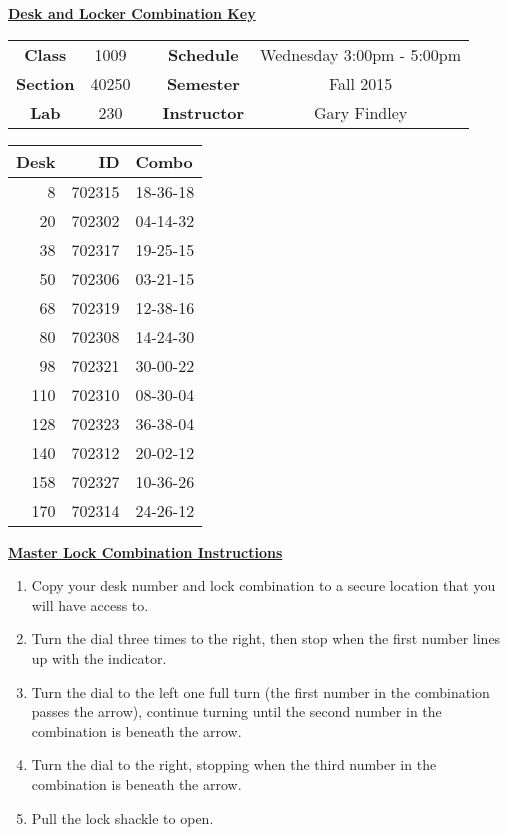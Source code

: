 \documentclass[12pt]{article}
\begin{document}
\thispagestyle{empty}

\begin{center}
	{\huge\textbf{\underline{ Desk and Locker Combination Key}}}
\end{center}


\begin{table}[h]
  \centering
  \begin{tabular}{ccccc}

  \textbf{Class} & 1009 & {\qquad} &\textbf{Schedule} & Wednesday 3:00pm - 5:00pm \\
  \textbf{Section} & 40250 & {\qquad} & \textbf{Semester} & Fall 2015 \\
  \textbf{Lab} & 230 & {\qquad} & \textbf{Instructor} & Gary Findley \\
  \end{tabular}
\end{table}
 \vspace{0.1in}
\begin{minipage}{0.4\textwidth}

\begin{tabular}{rrl}
\toprule
 Desk &      ID &     Combo \\
\midrule
    8 &  702315 &  18-36-18 \\
   20 &  702302 &  04-14-32 \\
   38 &  702317 &  19-25-15 \\
   50 &  702306 &  03-21-15 \\
   68 &  702319 &  12-38-16 \\
   80 &  702308 &  14-24-30 \\
   98 &  702321 &  30-00-22 \\
  110 &  702310 &  08-30-04 \\
  128 &  702323 &  36-38-04 \\
  140 &  702312 &  20-02-12 \\
  158 &  702327 &  10-36-26 \\
  170 &  702314 &  24-26-12 \\
\bottomrule
\end{tabular}


\end{minipage}
\begin{minipage}{0.4\textwidth}
\underline{{\large \textbf{Master Lock Combination Instructions}}}
\begin{enumerate}
\item Copy your desk number and lock combination to a secure location that you will have access to.
\item Turn the dial three times to the right, then stop when the first number lines up with the indicator.
\item Turn the dial to the left one full turn (the first number in the combination passes the arrow), continue turning until the second number in the combination is beneath the arrow.
\item Turn the dial to the right, stopping when the third number in the combination is beneath the arrow.
\item Pull the lock shackle to open.
\end{enumerate}
\end{minipage}
\end{document}
